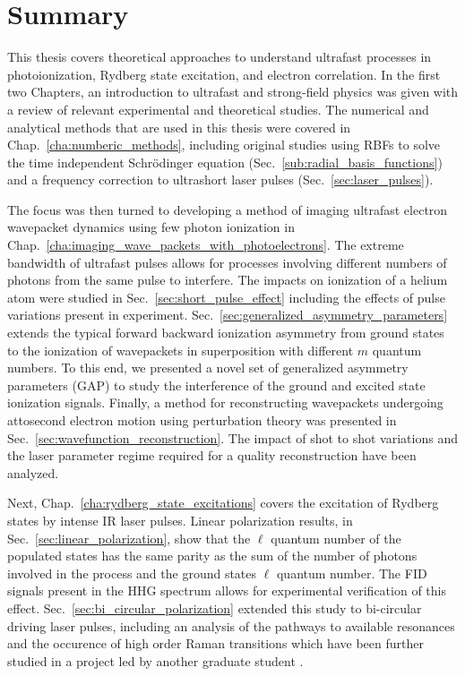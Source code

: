 \chapter{Summary} %
\label{cha:summary}

This thesis covers theoretical approaches to understand ultrafast processes in photoionization, Rydberg state excitation, and electron correlation.  In the first two Chapters, an introduction to ultrafast and strong-field physics was given with a review of relevant experimental and theoretical studies. The numerical  and analytical methods that are used in this thesis were covered in Chap.~\ref{cha:numberic_methods}, including original studies using RBFs to solve the time independent Schr\"odinger equation (Sec.~\ref{sub:radial_basis_functions}) and a frequency correction to ultrashort laser pulses (Sec.~\ref{sec:laser_pulses}).

The focus was then turned to developing a method of imaging ultrafast electron wavepacket dynamics using few photon ionization in Chap.~\ref{cha:imaging_wave_packets_with_photoelectrons}. The extreme bandwidth of ultrafast pulses allows for processes involving different numbers of photons from the same pulse to interfere. The impacts on ionization of a helium atom were studied in Sec.~\ref{sec:short_pulse_effect} including the effects of pulse variations present in experiment. Sec.~\ref{sec:generalized_asymmetry_parameters} extends the typical forward backward ionization asymmetry from ground states to the ionization of wavepackets in superposition with different $m$ quantum numbers. To this end, we presented a novel set of generalized asymmetry parameters (GAP) to study the interference of the ground and excited state ionization signals. Finally, a method for reconstructing wavepackets undergoing attosecond electron motion using perturbation theory was presented in Sec.~\ref{sec:wavefunction_reconstruction}. The impact of shot to shot variations and the laser parameter regime required for a quality reconstruction have been analyzed.

Next, Chap.~\ref{cha:rydberg_state_excitations} covers the excitation of Rydberg states by intense IR laser pulses. Linear polarization results, in Sec.~\ref{sec:linear_polarization}, show that the $\ell$ quantum number of the populated states has the same parity as the sum of the number of photons involved in the process and the ground states $\ell$ quantum number. The FID signals present in the HHG spectrum allows for experimental verification of this effect. Sec.~\ref{sec:bi_circular_polarization} extended this study to bi-circular driving laser pulses, including an analysis of the pathways to available resonances and the occurence of high order Raman transitions which have been further studied in a project led by another graduate student \cite{gebre2021}.

